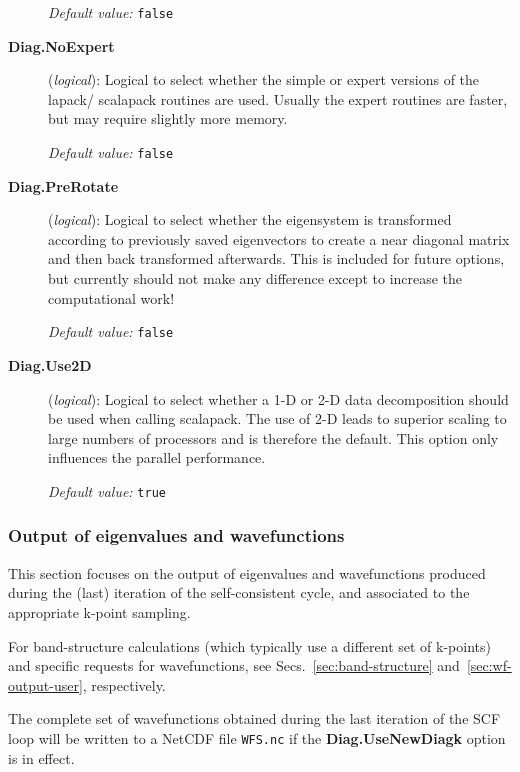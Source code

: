 \begin{description}
\textit{Default value:} \texttt{false}

\item[\textbf{Diag.NoExpert}] (\textit{logical}):
Logical to select whether the simple or expert versions of the lapack/
scalapack routines are used. Usually the expert routines are faster, but
may require slightly more memory.

\textit{Default value:} \texttt{false}

\item[\textbf{Diag.PreRotate}] (\textit{logical}):
Logical to select whether the eigensystem is transformed according to
previously saved eigenvectors to create a near diagonal matrix and then
back transformed afterwards. This is included for future options, but
currently should not make any difference except to increase the
computational work!

\textit{Default value:} \texttt{false}

\item[\textbf{Diag.Use2D}] (\textit{logical}):
Logical to select whether a 1-D or 2-D data decomposition should be used
when calling scalapack. The use of 2-D leads to superior scaling to
large numbers of processors and is therefore the default. This option
only influences the parallel performance.

\textit{Default value:} \texttt{true}

\end{description}

\subsubsection{Output of eigenvalues and wavefunctions}

This section focuses on the output of eigenvalues and wavefunctions
produced during the (last) iteration of the self-consistent cycle,
and associated to the appropriate k-point sampling.

For band-structure calculations (which typically use a different set
of k-points) and specific requests for wavefunctions, see
Secs.~\ref{sec:band-structure} and~\ref{sec:wf-output-user}, respectively.

The complete set of wavefunctions obtained during the last
iteration of the SCF loop will be written to a NetCDF file
\texttt{WFS.nc} if the \textbf{Diag.UseNewDiagk} option is in effect.

